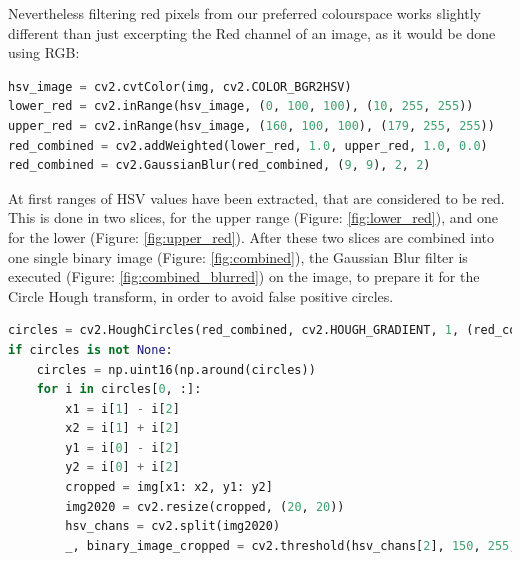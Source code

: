 Nevertheless filtering red pixels from our preferred colourspace works slightly different than just excerpting the Red channel of an image, as it would be done using RGB:


\lstset{style=custompy}
\begin{minipage}{\linewidth}
\begin{lstlisting}[language=python]
hsv_image = cv2.cvtColor(img, cv2.COLOR_BGR2HSV)
lower_red = cv2.inRange(hsv_image, (0, 100, 100), (10, 255, 255))
upper_red = cv2.inRange(hsv_image, (160, 100, 100), (179, 255, 255))
red_combined = cv2.addWeighted(lower_red, 1.0, upper_red, 1.0, 0.0)
red_combined = cv2.GaussianBlur(red_combined, (9, 9), 2, 2)
\end{lstlisting}
\end{minipage}

At first ranges of HSV values have been extracted, that are considered to be red. This is done in two slices, for the upper range (Figure: \ref{fig:lower_red}), and one for the lower (Figure: \ref{fig:upper_red}). After these two slices are combined into one single binary image (Figure: \ref{fig:combined}), the Gaussian Blur filter is executed (Figure: \ref{fig:combined_blurred}) on the image, to prepare it for the Circle Hough transform, in order to avoid false positive circles.\newline
 

\begin{minipage}{\linewidth}
\begin{lstlisting}[language=python]
circles = cv2.HoughCircles(red_combined, cv2.HOUGH_GRADIENT, 1, (red_combined.shape[0]) / 2, param1=100, param2=20, minRadius=10, maxRadius=0)
if circles is not None:
	circles = np.uint16(np.around(circles))
	for i in circles[0, :]:
		x1 = i[1] - i[2]
		x2 = i[1] + i[2]
		y1 = i[0] - i[2]
		y2 = i[0] + i[2]
		cropped = img[x1: x2, y1: y2]
		img2020 = cv2.resize(cropped, (20, 20))
		hsv_chans = cv2.split(img2020)
		_, binary_image_cropped = cv2.threshold(hsv_chans[2], 150, 255, cv2.THRESH_BINARY)
\end{lstlisting}
\end{minipage}

